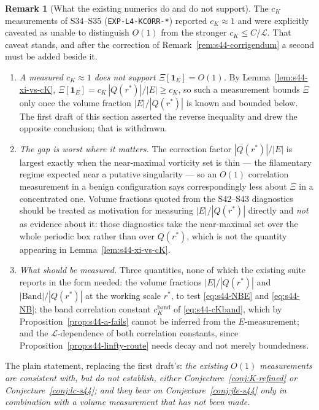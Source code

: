 \documentclass[11pt]{article}
\theoremstyle{definition}
\newtheorem{remark}[theorem]{Remark}
\theoremstyle{remark}
\begin{document}
\begin{remark}[What the existing numerics do and do not support]
  \label{rem:s44-numerics}
  The $c_K$ measurements of S34--S35 (\texttt{EXP-L4-KCORR-*}) reported
  $c_K\approx1$ and were explicitly caveated as unable to distinguish $O(1)$
  from the stronger $c_K\leq C/\mathcal{L}$. That caveat stands, and after the
  correction of Remark~\ref{rem:s44-corrigendum} a second must be added
  beside it.
  \begin{enumerate}[label=(\roman*)]
    \item \emph{A measured $c_K\approx1$ does not support
      $\Xi[\mathbf{1}_E]=O(1)$.} By Lemma~\ref{lem:s44-xi-vs-cK},
      $\Xi[\mathbf{1}_E]=c_K\,|Q(r^*)|/|E|\geq c_K$, so such a measurement
      bounds $\Xi$ only once the volume fraction $|E|/|Q(r^*)|$ is known and
      bounded below. The first draft of this section asserted the reverse
      inequality and drew the opposite conclusion; that is withdrawn.
    \item \emph{The gap is worst where it matters.} The correction factor
      $|Q(r^*)|/|E|$ is largest exactly when the near-maximal vorticity set is
      thin --- the filamentary regime expected near a putative singularity ---
      so an $O(1)$ correlation measurement in a benign configuration says
      correspondingly less about $\Xi$ in a concentrated one. Volume fractions
      quoted from the S42--S43 diagnostics should be treated as motivation for
      measuring $|E|/|Q(r^*)|$ directly and \emph{not} as evidence about it:
      those diagnostics take the near-maximal set over the whole periodic box
      rather than over $Q(r^*)$, which is not the quantity appearing in
      Lemma~\ref{lem:s44-xi-vs-cK}.
    \item \emph{What should be measured.} Three quantities, none of which the
      existing suite reports in the form needed: the volume fractions
      $|E|/|Q(r^*)|$ and $|\mathrm{Band}|/|Q(r^*)|$ at the working scale
      $r^*$, to test \eqref{eq:s44-NBE} and \eqref{eq:s44-NB}; the band
      correlation constant $c_K^{\mathrm{band}}$ of \eqref{eq:s44-cKband},
      which by Proposition~\ref{prop:s44-a-fails} cannot be inferred from the
      $E$-measurement; and the $\mathcal{L}$-dependence of both correlation
      constants, since Proposition~\ref{prop:s44-linfty-route} needs decay and
      not merely boundedness.
  \end{enumerate}
  The plain statement, replacing the first draft's: \emph{the existing $O(1)$
  measurements are consistent with, but do not establish, either
  Conjecture~\ref{conj:K-refined} or Conjecture~\ref{conj:lc-s44}; and they
  bear on Conjecture~\ref{conj:jle-s44} only in combination with a volume
  measurement that has not been made.}
\end{remark}
\end{document}

